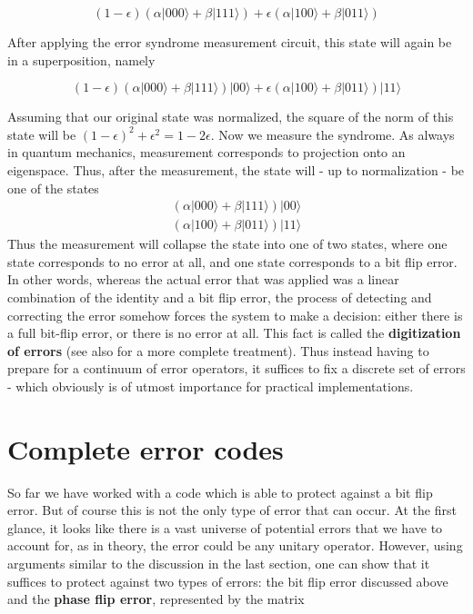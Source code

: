 \documentclass[a4paper, draft]{article}
\theoremstyle{own}
\theoremstyle{remark}
\begin{document}
$$
(1-\epsilon)(\alpha |000 \rangle + \beta |111 \rangle) + \epsilon (\alpha |100 \rangle + \beta |011\rangle)
$$

After applying the error syndrome measurement circuit, this state will again be in a superposition, namely 

$$
(1-\epsilon)(\alpha |000 \rangle + \beta |111 \rangle)|00\rangle + \epsilon (\alpha |100 \rangle + \beta |011\rangle) |11 \rangle
$$

Assuming that our original state was normalized, the square of the norm of this state will be $(1-\epsilon)^2 + \epsilon^2 = 1 - 2\epsilon$. Now we measure the syndrome. As always in quantum mechanics, measurement corresponds to projection onto an eigenspace. Thus, after the measurement, the state will - up to normalization - be one of the states
\begin{align*}
(\alpha |000 \rangle + \beta |111 \rangle)|00\rangle \\
(\alpha |100 \rangle + \beta |011\rangle) |11 \rangle
\end{align*}
Thus the measurement will collapse the state into one of two states, where one state corresponds to no error at all, and one state corresponds to a bit flip error. In other words, whereas the actual error that was applied was a linear combination of the identity and a bit flip error, the process of detecting and correcting the error somehow forces the system to make a decision: either there is a full bit-flip error, or there is no error at all. This fact is called the {\bf digitization of errors} (see also \cite{Steane} for a more complete treatment). Thus instead having to prepare for a continuum of error operators, it suffices to fix a discrete set of errors - which obviously is of utmost importance for practical implementations.



\section{Complete error codes}

So far we have worked with a code which is able to protect against a bit flip error. But of course this is not the only type of error that can occur. At the first glance, it looks like there is a vast universe of potential errors that we have to account for, as in theory, the error could be any unitary operator. However, using arguments similar to the discussion in the last section, one can show that it suffices to protect against two types of errors: the bit flip error discussed above and the {\bf phase flip error}, represented by the matrix
\end{document}
